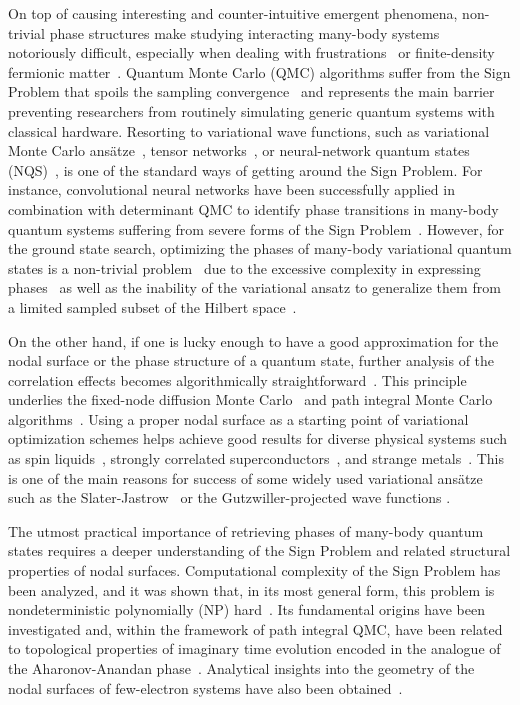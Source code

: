 On top of causing interesting and counter-intuitive emergent phenomena, non-trivial phase structures make studying interacting many-body systems notoriously difficult, especially when dealing with frustrations~\cite{frustrations} or finite-density fermionic matter~\cite{finite_density}. Quantum Monte Carlo (QMC) algorithms suffer from the Sign Problem that spoils the sampling convergence~\cite{sign_problem} and represents the main barrier preventing researchers from routinely simulating generic quantum systems with classical hardware. Resorting to variational wave functions, such as variational Monte Carlo ans\"atze~\cite{vmc}, tensor networks~\cite{Orus}, or neural-network quantum states (NQS)~\cite{Carleo}, is one of the standard ways of getting around the Sign Problem. For instance, convolutional neural networks have been successfully applied in combination with determinant QMC to identify phase transitions in many-body quantum systems suffering from severe forms of the Sign Problem~\cite{Trebst}. However, for the ground state search, optimizing the phases of many-body variational quantum states is a non-trivial problem~\cite{sign_generalization,Szabo_2020_Neural_network} due to the excessive complexity in expressing phases~\cite{kastoryano} as well as the inability of the variational ansatz to generalize them from a limited sampled subset of the Hilbert space~\cite{sign_generalization}. 

On the other hand, if one is lucky enough to have a good approximation for the nodal surface or the phase structure of a quantum state, further analysis of the correlation effects becomes algorithmically straightforward~\cite{Ceperley}. This principle underlies the fixed-node diffusion Monte Carlo~\cite{fixed_node} and path integral Monte Carlo algorithms~\cite{Ceperley_path}. Using a proper nodal surface as a starting point of variational optimization schemes helps achieve good results for diverse physical systems such as spin liquids~\cite{spin_liquids, astrakhantsev2021}, strongly correlated superconductors~\cite{Imada_SC}, and strange metals~\cite{strange_metals}. This is one of the main reasons for success of some widely used variational ans\"atze such as the Slater-Jastrow~\cite{Slater_Jastrow_1, Slater_Jastrow_2} or the Gutzwiller-projected wave functions \cite{Gutzwiller, Nomura, ferrari2019neural}.

The utmost practical importance of retrieving phases of many-body quantum states requires a deeper understanding of the Sign Problem and related structural properties of nodal surfaces. Computational complexity of the Sign Problem has been analyzed, and it was shown that, in its most general form, this problem is nondeterministic polynomially (NP) hard~\cite{NP_Troyer}. Its fundamental origins have been investigated and, within the framework of path integral QMC, have been related to topological properties of imaginary time evolution encoded in the analogue of the Aharonov-Anandan phase~\cite{Soluyanov}. Analytical insights into the geometry of the nodal surfaces of few-electron systems have also been obtained~\cite{nodal1, nodal2}.

